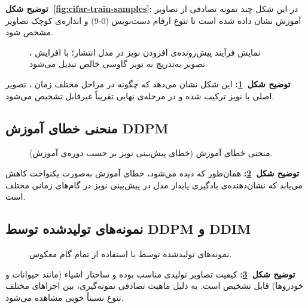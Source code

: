 \noindent\textbf{توضیح شکل~\ref{fig:cifar-train-samples}:}
در این شکل چند نمونه تصادفی از تصاویر آموزش نشان داده شده است تا تنوع ارقام دست‌نویس
(0-9)
و اندازه‌ی کوچک تصاویر  مشخص شود.

\begin{figure}[H]
    \centering
    \caption{نمایش فرآیند پیش‌رونده‌ی افزودن نویز در مدل انتشار؛ با افزایش ، تصویر به‌تدریج به نویز گاوسی خالص تبدیل می‌شود.}
    \label{fig:forward-diffusion}
\end{figure}

\noindent\textbf{توضیح شکل~\ref{fig:forward-diffusion}:}
این شکل نشان می‌دهد که چگونه در مراحل مختلف زمان ، تصویر اصلی با نویز ترکیب شده و در مرحله‌ی نهایی تقریباً غیرقابل تشخیص می‌شود.

\subsection{منحنی خطای آموزش DDPM}

\begin{figure}[H]
    \centering
    \caption{منحنی خطای آموزش  (خطای  پیش‌بینی نویز بر حسب دوره‌ی آموزش).}
    \label{fig:ddpm-train-loss}
\end{figure}

\noindent\textbf{توضیح شکل~\ref{fig:ddpm-train-loss}:}
همان‌طور که دیده می‌شود، خطای آموزش به‌صورت یکنواخت کاهش می‌یابد که نشان‌دهنده‌ی یادگیری پایدار مدل در پیش‌بینی نویز در گام‌های زمانی مختلف است.

\subsection{نمونه‌های تولیدشده توسط DDPM و DDIM}

\begin{figure}[H]
    \centering
    \caption{نمونه‌های تولیدشده توسط  با استفاده از تمام  گام معکوس.}
    \label{fig:ddpm-samples}
\end{figure}

\noindent\textbf{توضیح شکل~\ref{fig:ddpm-samples}:}
کیفیت تصاویر تولیدی مناسب بوده و ساختار اشیاء (مانند حیوانات و خودروها) قابل تشخیص است. به دلیل ماهیت تصادفی نمونه‌گیری، بین اجراهای مختلف تنوع نسبتاً خوبی مشاهده می‌شود.

